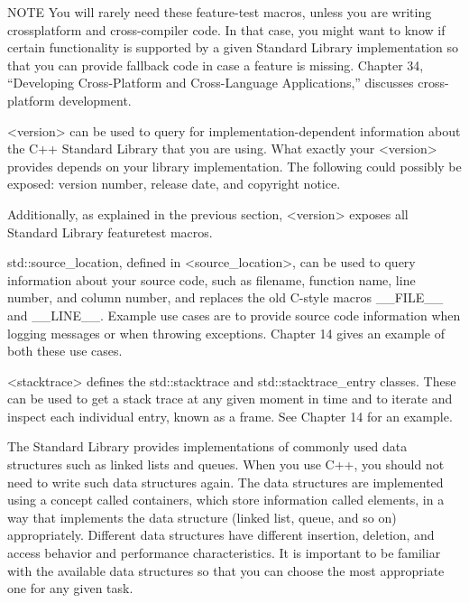 \begin{myNotic}{NOTE}
You will rarely need these feature-test macros, unless you are writing crossplatform and cross-compiler code. In that case, you might want to know if certain functionality is supported by a given Standard Library implementation so that you can provide fallback code in case a feature is missing. Chapter 34, “Developing Cross-Platform and Cross-Language Applications,” discusses cross-platform development.
\end{myNotic}


<version> can be used to query for implementation-dependent information about the C++ Standard Library that you are using. What exactly your <version> provides depends on your library implementation. The following could possibly be exposed: version number, release date, and copyright notice.

Additionally, as explained in the previous section, <version> exposes all Standard Library featuretest macros.


std::source\_location, defined in <source\_location>, can be used to query information about your source code, such as filename, function name, line number, and column number, and replaces the old C-style macros \_\_FILE\_\_ and \_\_LINE\_\_. Example use cases are to provide source code information when logging messages or when throwing exceptions. Chapter 14 gives an example of both these use cases.



<stacktrace> defines the std::stacktrace and std::stacktrace\_entry classes. These can be used to get a stack trace at any given moment in time and to iterate and inspect each individual entry, known as a frame. See Chapter 14 for an example.


The Standard Library provides implementations of commonly used data structures such as linked lists and queues. When you use C++, you should not need to write such data structures again. The data structures are implemented using a concept called containers, which store information called elements, in a way that implements the data structure (linked list, queue, and so on) appropriately. Different data structures have different insertion, deletion, and access behavior and performance characteristics. It is important to be familiar with the available data structures so that you can choose the most appropriate one for any given task.

